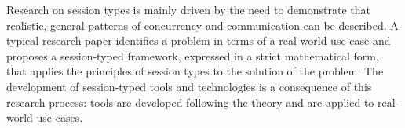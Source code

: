 


Research on session types is mainly driven by the need to demonstrate that realistic,
general patterns of concurrency and communication can be described.
A typical research paper identifies a problem in terms of a real-world use-case and 
proposes a session-typed framework, expressed in a strict mathematical form, 
that applies the principles of session types to the solution of the problem.
The development of session-typed tools and technologies is a consequence of this
research process: tools are developed following the theory and are applied to real-world use-cases.

